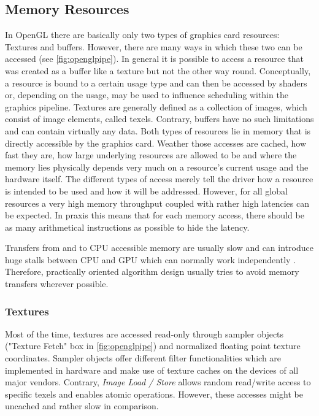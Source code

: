 \documentclass[thesis.tex]{subfiles}
\begin{document}
\subsection{Memory Resources} \label{sec:preq:memory}
In OpenGL there are basically only two types of graphics card resources: Textures and buffers.
However, there are many ways in which these two can be accessed (see \autoref{fig:openglpipe}).
In general it is possible to access a resource that was created as a buffer like a texture but not the other way round.
Conceptually, a resource is bound to a certain usage type and can then be accessed by shaders or, depending on the usage, may be used to influence scheduling within the graphics pipeline.
Textures are generally defined as a collection of images, which consist of image elements, called texels. %
Contrary, buffers have no such limitations and can contain virtually any data.
Both types of resources lie in memory that is directly accessible by the graphics card.
Weather those accesses are cached, how fast they are, how large underlying resources are allowed to be and where the memory lies physically depends very much on a resource's current usage and the hardware itself.
The different types of access merely tell the driver how a resource is intended to be used and how it will be addressed.
However, for all global resources a very high memory throughput coupled with rather high latencies can be expected.
In praxis this means that for each memory access, there should be as many arithmetical instructions as possible to hide the latency.

Transfers from and to CPU accessible memory are usually slow and can introduce huge stalls between CPU and GPU which can normally work independently \cite{bib:openglinsightstransfer}.
Therefore, practically oriented algorithm design usually tries to avoid memory transfers wherever possible.

\subsubsection{Textures}
Most of the time, textures are accessed read-only through sampler objects ("Texture Fetch" box in \autoref{fig:openglpipe}) and normalized floating point texture coordinates.
Sampler objects offer different filter functionalities which are implemented in hardware and make use of texture caches on the devices of all major vendors.
Contrary, \emph{Image Load / Store} allows random read/write access to specific texels and enables atomic operations.
However, these accesses might be uncached and rather slow in comparison.
\end{document}
